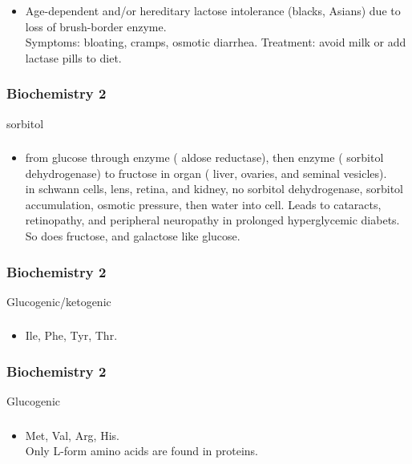 \documentclass[11pt]{beamer}
\begin{document}
\begin{frame}
 \frametitle{}
\begin{itemize}
\item Age-dependent and/or hereditary lactose intolerance (blacks, Asians) due to loss of brush-border enzyme. \\ Symptoms: bloating, cramps, osmotic diarrhea. Treatment: avoid milk or add lactase pills to diet.
\end{itemize}
\end{frame}

\begin{frame}
 \frametitle{Biochemistry 2}
sorbitol 
\end{frame}

\begin{frame}
 \frametitle{}
\begin{itemize}
\item from glucose through enzyme ( aldose reductase), then enzyme ( sorbitol dehydrogenase) to fructose in organ ( liver, ovaries, and seminal vesicles).  \\ in schwann cells, lens, retina, and kidney, no sorbitol dehydrogenase, sorbitol accumulation, osmotic pressure, then water into cell. Leads to cataracts, retinopathy, and peripheral neuropathy in prolonged hyperglycemic diabets. So does fructose, and galactose like glucose. 
\end{itemize}
\end{frame}

\begin{frame}
 \frametitle{Biochemistry 2}
Glucogenic/ketogenic
\end{frame}

\begin{frame}
 \frametitle{}
\begin{itemize}
\item Ile, Phe, Tyr, Thr.
\end{itemize}
\end{frame}

\begin{frame}
 \frametitle{Biochemistry 2}
Glucogenic
\end{frame}

\begin{frame}
 \frametitle{}
\begin{itemize}
\item Met, Val, Arg, His. \\ Only L-form amino acids are found in proteins.
\end{itemize}
\end{frame}
\end{document}
